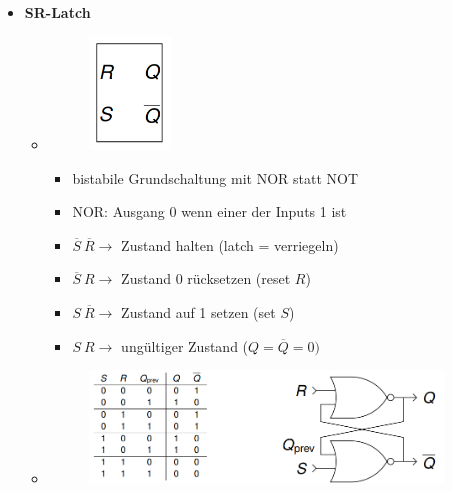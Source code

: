 \documentclass[11pt,a4paper]{article}
\begin{document}
\begin{itemize}
\item \textbf{SR-Latch}
	\begin{itemize}
	\item[]		
				\begin{minipage}{0.25\textwidth}
					\begin{figure}[H]
					\includegraphics[height=3cm]{Bilder/srlatch1}
					\end{figure}
				\end{minipage}
				\begin{minipage}[t]{0.6\textwidth}
					\vspace{-1.25cm}
					\begin{itemize}
					\item bistabile Grundschaltung mit NOR statt NOT
					\item NOR: Ausgang 0 wenn einer der Inputs 1 ist
					\item $\overline{S}~\overline{R} \rightarrow$ Zustand halten (latch = verriegeln)
					\item $\overline{S}~R \rightarrow$ Zustand 0 rücksetzen (reset $R$)
					\item $S~\overline{R} \rightarrow$ Zustand auf 1 setzen (set $S$)
					\item $S~R \rightarrow$ ungültiger Zustand ($Q=\overline{Q}=0)$
					\end{itemize}
				\end{minipage}
				
	\item[] \begin{figure}[H]
				\begin{center}
				\includegraphics[height=3cm]{Bilder/srlatch2}
				\end{center}
			\end{figure}
	\end{itemize}
	

\end{itemize}
\end{document}
